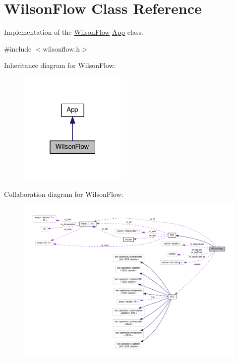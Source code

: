 \hypertarget{classWilsonFlow}{}\section{Wilson\+Flow Class Reference}
\label{classWilsonFlow}


Implementation of the \hyperlink{classWilsonFlow}{Wilson\+Flow} \hyperlink{classApp}{App} class.  




{\ttfamily \#include $<$wilsonflow.\+h$>$}



Inheritance diagram for Wilson\+Flow\+:\nopagebreak
\begin{figure}[H]
\begin{center}
\leavevmode
\includegraphics[width=148pt]{d3/d84/classWilsonFlow__inherit__graph}
\end{center}
\end{figure}


Collaboration diagram for Wilson\+Flow\+:\nopagebreak
\begin{figure}[H]
\begin{center}
\leavevmode
\includegraphics[width=350pt]{d6/da6/classWilsonFlow__coll__graph}
\end{center}
\end{figure}

